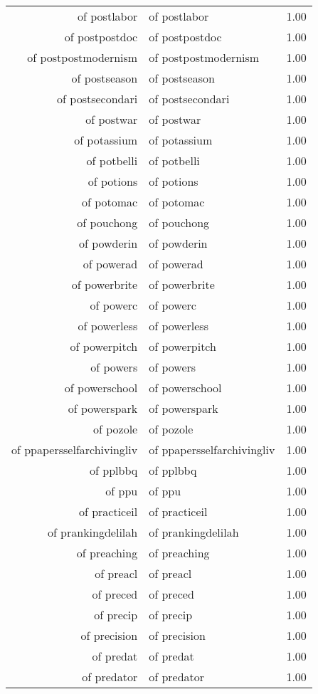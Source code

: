 \begin{table}[ht]
\begin{tabular}{rlr}
  of postlabor & of postlabor & 1.00 \\ 
  of postpostdoc & of postpostdoc & 1.00 \\ 
  of postpostmodernism & of postpostmodernism & 1.00 \\ 
  of postseason & of postseason & 1.00 \\ 
  of postsecondari & of postsecondari & 1.00 \\ 
  of postwar & of postwar & 1.00 \\ 
  of potassium & of potassium & 1.00 \\ 
  of potbelli & of potbelli & 1.00 \\ 
  of potions & of potions & 1.00 \\ 
  of potomac & of potomac & 1.00 \\ 
  of pouchong & of pouchong & 1.00 \\ 
  of powderin & of powderin & 1.00 \\ 
  of powerad & of powerad & 1.00 \\ 
  of powerbrite & of powerbrite & 1.00 \\ 
  of powerc & of powerc & 1.00 \\ 
  of powerless & of powerless & 1.00 \\ 
  of powerpitch & of powerpitch & 1.00 \\ 
  of powers & of powers & 1.00 \\ 
  of powerschool & of powerschool & 1.00 \\ 
  of powerspark & of powerspark & 1.00 \\ 
  of pozole & of pozole & 1.00 \\ 
  of ppapersselfarchivingliv & of ppapersselfarchivingliv & 1.00 \\ 
  of pplbbq & of pplbbq & 1.00 \\ 
  of ppu & of ppu & 1.00 \\ 
  of practiceil & of practiceil & 1.00 \\ 
  of prankingdelilah & of prankingdelilah & 1.00 \\ 
  of preaching & of preaching & 1.00 \\ 
  of preacl & of preacl & 1.00 \\ 
  of preced & of preced & 1.00 \\ 
  of precip & of precip & 1.00 \\ 
  of precision & of precision & 1.00 \\ 
  of predat & of predat & 1.00 \\ 
  of predator & of predator & 1.00 \\ 

\end{tabular}
\end{table}
